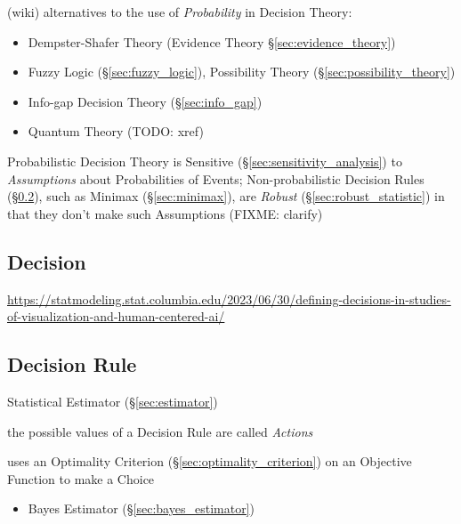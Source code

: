 (wiki) alternatives to the use of \emph{Probability} in Decision Theory:
\begin{itemize}
  \item Dempster-Shafer Theory (Evidence Theory \S\ref{sec:evidence_theory})
  \item Fuzzy Logic (\S\ref{sec:fuzzy_logic}), Possibility Theory
    (\S\ref{sec:possibility_theory})
  \item Info-gap Decision Theory (\S\ref{sec:info_gap})
  \item Quantum Theory (TODO: xref)
\end{itemize}
Probabilistic Decision Theory is Sensitive (\S\ref{sec:sensitivity_analysis}) to
\emph{Assumptions} about Probabilities of Events; Non-probabilistic Decision
Rules (\S\ref{sec:decision_rule}), such as Minimax (\S\ref{sec:minimax}), are
\emph{Robust} (\S\ref{sec:robust_statistic}) in that they don't make such
Assumptions (FIXME: clarify)



\subsection{Decision}\label{sec:decision}

\url{https://statmodeling.stat.columbia.edu/2023/06/30/defining-decisions-in-studies-of-visualization-and-human-centered-ai/}



\subsection{Decision Rule}\label{sec:decision_rule}

Statistical Estimator (\S\ref{sec:estimator})

the possible values of a Decision Rule are called \emph{Actions}

uses an Optimality Criterion (\S\ref{sec:optimality_criterion}) on an Objective
Function to make a Choice

\begin{itemize}
  \item Bayes Estimator (\S\ref{sec:bayes_estimator})
\end{itemize}




